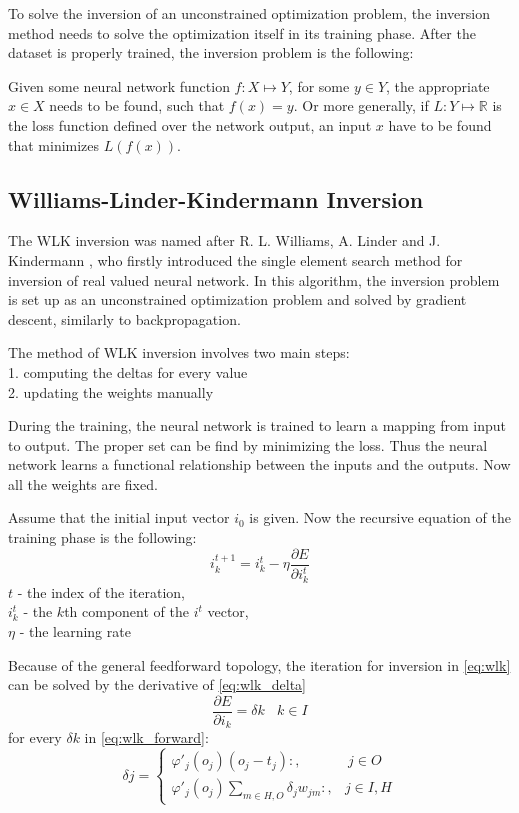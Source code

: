 To solve the inversion of an unconstrained optimization problem, the inversion method needs to solve the optimization itself in its training phase. After the dataset is properly trained, the inversion problem is the following:\medskip

Given some neural network function $f : X \mapsto Y$, for some $y \in Y$, the appropriate $x \in X$ needs to be found, such that $f(x) = y$. Or more generally, if $L : Y \mapsto \mathbb{R}$ is the loss function defined over the network output, an input $x$ have to be found that minimizes $L(f(x))$. 


\subsection{Williams-Linder-Kindermann Inversion}

\label{para:wlk-inv}The WLK inversion was named after R. L. Williams, A. Linder and J. Kindermann \cite{KINDERMANN1990277}, who firstly introduced the single element search method for inversion of real valued neural network. In this algorithm, the inversion problem is set up as an unconstrained optimization problem and solved by gradient descent, similarly to backpropagation. \medskip

\noindent The method of WLK inversion involves two main steps: \\
1. computing the deltas for every value \\
2. updating the weights manually \bigskip

During the training, the neural network is trained to learn a mapping from input to output. The proper set can be find by minimizing the loss. Thus the neural network learns a functional relationship between the inputs and the outputs. Now all the weights are fixed. \medskip

Assume that the initial input vector $i_0$ is given. Now the recursive equation of the training phase is the following: 
\begin{equation} i_k^{t+1} = i_k^t - \eta \frac{\partial E}{\partial i_k^t} \label{eq:wlk} \end{equation} 
$t$ - the index of the iteration, \\
$i_k^t$ - the $k$th component of the $i^t$ vector, \\
$\eta$ - the learning rate \bigskip

Because of the general feedforward topology, the iteration for inversion in \autoref{eq:wlk} can be solved by the derivative of \autoref{eq:wlk_delta}
\begin{equation} \frac{\partial E}{\partial i_k} = \delta k ~~~~ k \in I \label{eq:wlk_delta} \end{equation}
for every $\delta k$ in \autoref{eq:wlk_forward}:
\begin{equation} \delta j = \begin{cases} \varphi'_j(o_j)(o_j-t_j):, & ~ j \in O \\ 
\varphi'_j(o_j)\sum_{m\in H,O}\delta_j w_{jm}:, & j \in I, H \end{cases} \label{eq:wlk_forward} \end{equation}

